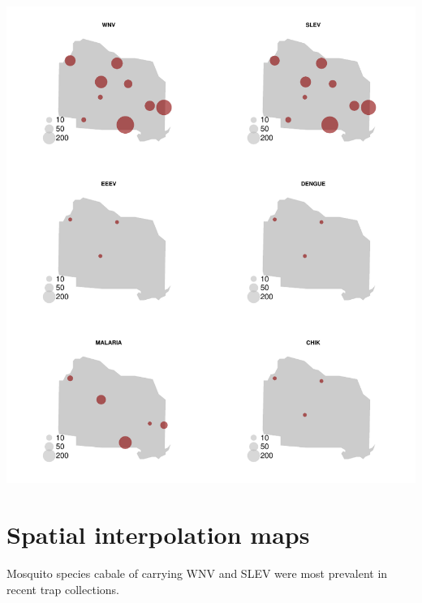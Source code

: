 \documentclass{article}
\begin{document}
\includegraphics{mosquitoReport-007}


\section*{Spatial interpolation maps}
\hrulefill
\vspace{5mm}

Mosquito species cabale of carrying WNV and SLEV were most prevalent in recent trap collections.
\end{document}
